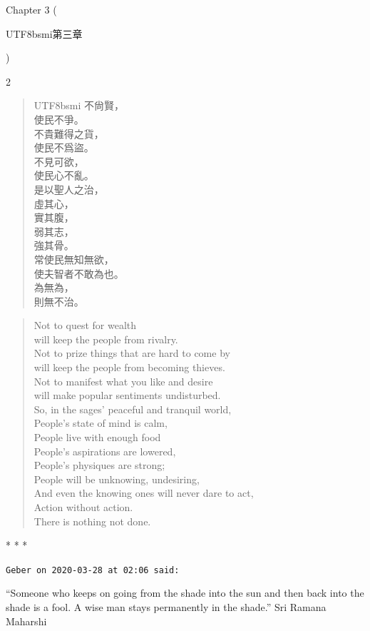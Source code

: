 Chapter 3 (\begin{CJK*}{UTF8}{bsmi}第三章\end{CJK*})
\begin{paracol}{2}
\begin{verse}
\begin{CJK*}{UTF8}{bsmi}
不尙賢，\\
使民不爭。\\ 不貴難得之貨，\\ 使民不爲盜。\\ 不見可欲，\\ 使民心不亂。\\ 是以聖人之治，\\ 虛其心，\\ 實其腹，\\ 弱其志，\\ 強其骨。\\ 常使民無知無欲，\\ 使夫智者不敢為也。\\ 為無為，\\ 則無不治。
\end{CJK*}
\end{verse}
\switchcolumn
\begin{verse}
Not to quest for wealth\\ will keep the people from rivalry.\\ Not to prize things that are hard to come by\\ will keep the people from becoming thieves.\\ Not to manifest what you like and desire\\ will make popular sentiments undisturbed.\\ So, in the sages' peaceful and tranquil world,\\ People's state of mind is calm,\\ People live with enough food\\ People's aspirations are lowered,\\ People's physiques are strong;\\ People will be unknowing, undesiring,\\ And even the knowing ones will never dare to act,\\ Action without action.\\ There is nothing not done.
\end{verse}
\end{paracol}


\begin{center}* * *\end{center}

\begin{footnotesize}
\begin{sffamily}
\texttt{Geber on 2020-03-28 at 02:06 said:}

``Someone who keeps on going from the shade into the sun and then back into the shade is a fool. A wise man stays permanently in the shade.'' Sri Ramana Maharshi

\end{sffamily}
\end{footnotesize}

